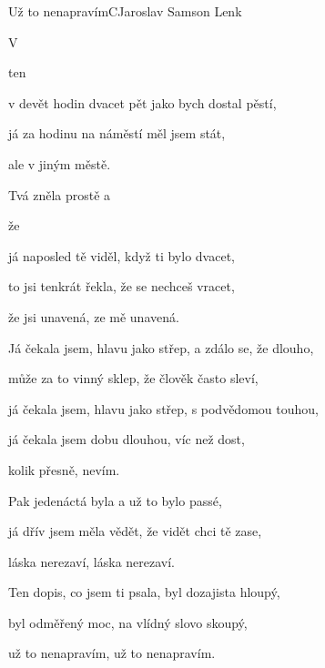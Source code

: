 \begin{song}{Už to nenapravím}{C}{Jaroslav Samson Lenk}

\begin{SBChorus}

   

\end{SBChorus}

\begin{SBVerse}

V 

ten 

v devět hodin dvacet pět jako bych dostal pěstí,

já za hodinu na náměstí měl jsem stát,

ale v jiným městě.

Tvá  zněla prostě a 

že 


já naposled tě viděl, když ti bylo dvacet,

to jsi tenkrát řekla, že se nechceš vracet,

že jsi unavená, ze mě unavená.

\end{SBVerse}

\begin{SBVerse}

Já čekala jsem, hlavu jako střep, a zdálo se, že dlouho,

může za to vinný sklep, že člověk často sleví,

já čekala jsem, hlavu jako střep, s podvědomou touhou,

já čekala jsem dobu dlouhou, víc než dost, 

kolik přesně, nevím.

Pak jedenáctá byla a už to bylo passé,

já dřív jsem měla vědět, že vidět chci tě zase,

láska nerezaví, láska nerezaví.

Ten dopis, co jsem ti psala, byl dozajista hloupý,

byl odměřený moc, na vlídný slovo skoupý,

už to nenapravím, už to nenapravím.

\end{SBVerse}
\end{song}

\pagebreak
